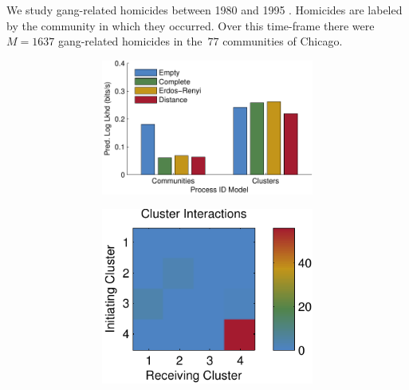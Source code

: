 We study gang-related homicides between 1980 and 1995
\cite{ICPSR}. Homicides are labeled by the community in which they
occurred. Over this time-frame there were~${M=1637}$ gang-related
homicides in the~${77}$ communities of Chicago.

\begin{figure}[!t]
  \begin{center}
    \begin{subfigure}[T]{.32\textwidth}
      \begin{subfigure}[T]{\textwidth}
        \begin{center}
          \caption{}
          \includegraphics[width=\linewidth]{figures/ch2/icpsr_pred_ll}
          \label{fig:chicago_predll}
        \end{center}
      \end{subfigure}
      \begin{subfigure}[B]{\textwidth}
        \vspace{1em}
        \begin{center}
          \caption{}
          \includegraphics[width=.7\linewidth]{figures/ch2/icpsr_interactions}\\

\end{center}
\end{subfigure}
\end{subfigure}
\end{center}
\end{figure}
